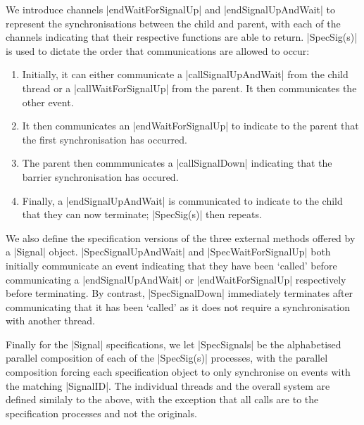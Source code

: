 We introduce channels |endWaitForSignalUp| and |endSignalUpAndWait| to represent the synchronisations between the child and parent, with each of the channels indicating that their respective functions are able to return. |SpecSig(s)| is used to dictate the order that communications are allowed to occur:

\begin{enumerate}
  \item Initially, it can either communicate a |callSignalUpAndWait| from the child thread or a |callWaitForSignalUp| from the parent. It then communicates the other event.
  \item It then communicates an |endWaitForSignalUp| to indicate to the parent that the first synchronisation has occurred.
  \item The parent then commmunicates a |callSignalDown| indicating that the barrier synchronisation has occured.
  \item Finally, a |endSignalUpAndWait| is communicated to indicate to the child that they can now terminate; |SpecSig(s)| then repeats.
\end{enumerate}

We also define the specification versions of the three external methods offered by a |Signal| object. |SpecSignalUpAndWait| and |SpecWaitForSignalUp| both initially communicate an event indicating that they have been `called' before communicating a |endSignalUpAndWait| or |endWaitForSignalUp| respectively before terminating. By contrast, |SpecSignalDown| immediately terminates after communicating that it has been `called' as it does not require a synchronisation with another thread.

Finally for the |Signal| specifications, we let |SpecSignals| be the alphabetised parallel composition of each of the |SpecSig(s)| processes, with the parallel composition forcing each specification object to only synchronise on events with the matching |SignalID|. The individual threads and the overall system are defined similaly to the above, with the exception that all calls are to the specification processes and not the originals.


